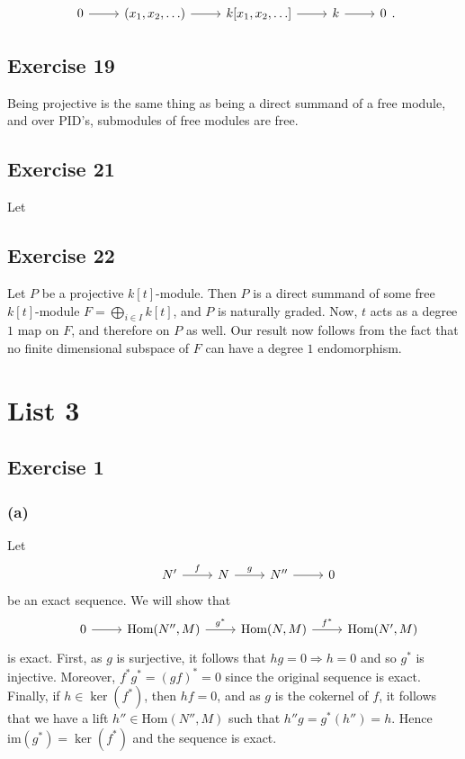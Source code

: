 \documentclass{article}
\theoremstyle{definition}
\newcommand{\Hom}{\text{Hom}}
\newcommand{\im}{\text{im}}
\begin{document}
\[
	\begin{tikzcd}
		0
		\arrow{r}
		&
		(x_1, x_2, \ldots)
		\arrow{r}
		&
		k[x_1, x_2, \ldots]
		\arrow{r}
		&
		k
		\arrow{r}
		&
		0
	\end{tikzcd}.
\] 


\subsection*{Exercise 19}

Being projective is the same thing as being a direct summand of a free module,
and over PID's, submodules of free modules are free.

\subsection*{Exercise 21}

Let 

\subsection*{Exercise 22}

Let $P$ be a projective $k[t]$-module. Then $P$ is a direct summand of some
free $k[t]$-module $F = \bigoplus_{i \in I} k[t]$, and $P$ is naturally graded.
Now, $t$ acts as a degree $1$ map on $F$, and therefore on $P$ as well. Our
result now follows from the fact that no finite dimensional subspace of $F$ can
have a degree $1$ endomorphism.

\section*{List 3}

\subsection*{Exercise 1}
\subsubsection*{(a)}
Let 
\[
\begin{tikzcd}
	& N'
	\arrow{r}{f} 
	& N
	\arrow{r}{g}
	& N''
	\arrow{r} 
	& 0
\end{tikzcd}
\] 
be an exact sequence. We will show that 
\[
\begin{tikzcd}
	& 0
	\arrow{r}
	& \Hom(N'', M)
	\arrow{r}{g^{*}} 
	& \Hom(N, M)
	\arrow{r}{f^{*}}
	& \Hom(N', M)
\end{tikzcd}
\]
is exact. First, as $g$ is surjective, it follows that $hg = 0 \Rightarrow h =
0$ and so $g^{*}$ is injective. Moreover, $f^{*}g^{*} = (gf)^{*} = 0$ since the
original sequence is exact. Finally, if $h \in \ker(f^{*})$, then $hf = 0$, and
as $g$ is the cokernel of $f$, it follows that we have a lift $h'' \in
\Hom(N'', M)$ such that $h''g = g^{*}(h'') = h$. Hence $\im(g^{*}) =
\ker(f^{*})$ and the sequence is exact.
\end{document}
